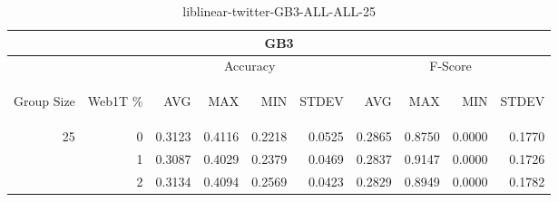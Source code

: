 \begin{center}
\begin{table}[htbp]
\begin{tabular}{ | r | r | r | r | r | r | r | r | r | r |}
\hline
\multicolumn{10}{|c|}{GB3}\\
\hline
 & & \multicolumn{4}{|c|}{Accuracy} & \multicolumn{4}{|c|}{F-Score}\\ \cline{3-10}
\begin{sideways}Group Size\end{sideways} & \begin{sideways}Web1T \%\end{sideways} & \begin{sideways}AVG\end{sideways} & \begin{sideways}MAX\end{sideways} & \begin{sideways}MIN\end{sideways} & \begin{sideways}STDEV\end{sideways} & \begin{sideways}AVG\end{sideways} & \begin{sideways}MAX\end{sideways} & \begin{sideways}MIN\end{sideways} & \begin{sideways}STDEV\end{sideways}\\
\hline
\multirow{2}{*}{25}
 & 0 & 0.3123 & 0.4116 & 0.2218 & 0.0525 & 0.2865 & 0.8750 & 0.0000 & 0.1770\\ \cline{2-10}
 & 1 & 0.3087 & 0.4029 & 0.2379 & 0.0469 & 0.2837 & 0.9147 & 0.0000 & 0.1726\\ \cline{2-10}
 & 2 & 0.3134 & 0.4094 & 0.2569 & 0.0423 & 0.2829 & 0.8949 & 0.0000 & 0.1782\\ \cline{2-10}
\hline
\end{tabular}
\caption{liblinear-twitter-GB3-ALL-ALL-25}
\label{table:liblinear-twitter-GB3-ALL-ALL-25}
\end{table}
\end{center}

